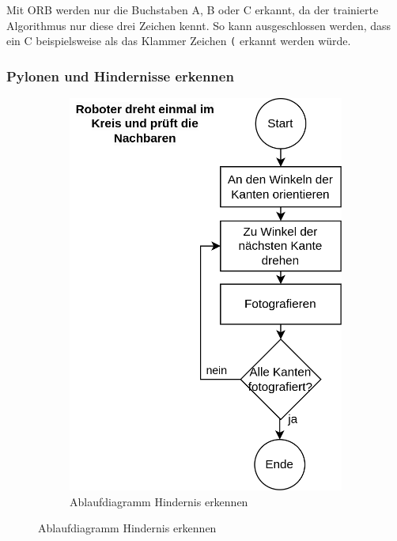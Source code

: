 Mit ORB werden nur die Buchstaben A, B oder C erkannt, da der trainierte Algorithmus nur diese drei Zeichen kennt. So kann ausgeschlossen werden, dass ein C beispielsweise als das Klammer Zeichen \verb|(| erkannt werden würde.


\subsubsection{Pylonen und Hindernisse erkennen}

\begin{figure}[H]
\begin{subfigure}{0.45\textwidth}
\includegraphics[width=\textwidth]{assets/gesamtkonzept/ablaufdiagramm-hindernisse-erkennen.png}
\caption{Ablaufdiagramm Hindernis erkennen}
\label{fig:ablaufdiagramm-hindernis-erkennen}
\end{subfigure}

\end{figure}
